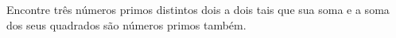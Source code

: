 Encontre três números primos distintos dois a dois tais que sua soma e a soma dos seus quadrados são números primos também.

